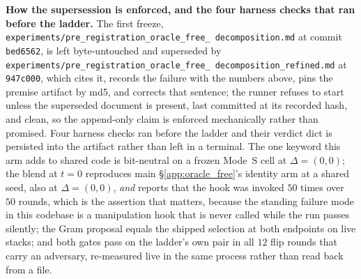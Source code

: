 \documentclass{article}
\begin{document}
\textbf{How the supersession is enforced, and the four harness checks that ran before the ladder.} The
first freeze, \texttt{experiments/\allowbreak pre\_registration\_\allowbreak oracle\_free\_\allowbreak
decomposition.md} at commit \texttt{bed6562}, is left byte-untouched and superseded by
\texttt{experiments/\allowbreak pre\_registration\_\allowbreak oracle\_free\_\allowbreak
decomposition\_refined.md} at \texttt{947c000}, which cites it, records the failure with the numbers above,
pins the premise artifact by md5, and corrects that sentence; the runner refuses to start unless the
superseded document is present, last committed at its recorded hash, and clean, so the append-only claim is
enforced mechanically rather than promised. Four harness checks ran before the ladder and their verdict
dict is persisted into the artifact rather than left in a terminal. The one keyword this arm adds to shared
code is bit-neutral on a frozen Mode~S cell at $\Delta=(0,0)$; the blend at $t{=}0$ reproduces main
§\ref{app:oracle_free}'s identity arm at a shared seed, also at $\Delta=(0,0)$, \emph{and} reports that the
hook was invoked $50$ times over $50$ rounds, which is the assertion that matters, because the standing
failure mode in this codebase is a manipulation hook that is never called while the run passes silently;
the Gram proposal equals the shipped selection at both endpoints on live stacks; and both gates pass on the
ladder's own pair in all $12$ flip rounds that carry an adversary, re-measured live in the same process
rather than read back from a file.
\end{document}
